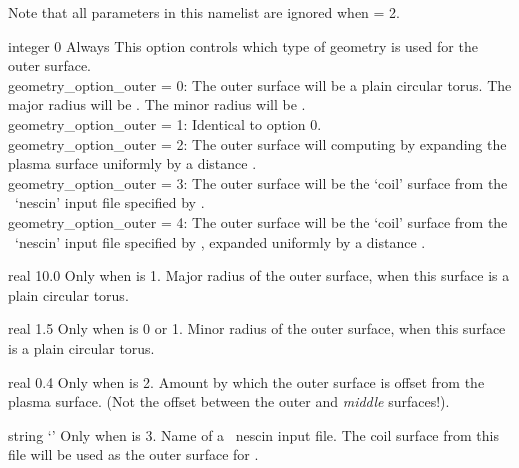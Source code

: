 Note that all parameters in this namelist are ignored
when  = 2.

\myhrule

{integer}
{0}
{Always}
{This option controls which type of geometry is used for the outer surface.\\

{\ttfamily geometry\_option\_outer} = 0: The outer surface will be a plain circular torus. The major radius will be .
     The minor radius will be .\\

{\ttfamily geometry\_option\_outer} = 1: Identical to option 0.\\

{\ttfamily geometry\_option\_outer} = 2: The outer surface will computing by expanding the plasma surface uniformly by a distance .\\

{\ttfamily geometry\_option\_outer} = 3: The outer surface will be the `coil' surface from the \nescoil~`nescin' input file specified by .\\

{\ttfamily geometry\_option\_outer} = 4: The outer surface will be the `coil' surface from the \nescoil~`nescin' input file specified by ,
expanded uniformly by a distance .
}

\myhrule

{real}
{10.0}
{Only when  is 1.}
{Major radius of the outer surface, when this surface is a plain circular torus.}

\myhrule

{real}
{1.5}
{Only when  is 0 or 1.}
{Minor radius of the outer surface, when this surface is a plain circular torus.}

\myhrule

{real}
{0.4}
{Only when  is 2.}
{Amount by which the outer surface is offset from the plasma surface.  (Not the offset between the outer and \emph{middle} surfaces!).}

\myhrule

{string}
{`'}
{Only when  is 3.}
{Name of a \nescoil~{\ttfamily nescin} input file. The coil surface from
this file will be used as the outer surface for \bdistrib.}

